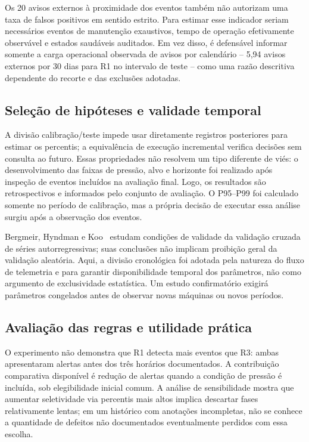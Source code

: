 \documentclass[conference]{IEEEtran}
\begin{document}
Os 20 avisos externos à proximidade dos eventos também não autorizam uma taxa de falsos positivos em sentido estrito. Para estimar esse indicador seriam necessários eventos de manutenção exaustivos, tempo de operação efetivamente observável e estados saudáveis auditados. Em vez disso, é defensável informar somente a carga operacional observada de avisos por calendário -- 5,94 avisos externos por 30 dias para R1 no intervalo de teste -- como uma razão descritiva dependente do recorte e das exclusões adotadas.

\subsection{Seleção de hipóteses e validade temporal}

A divisão calibração/teste impede usar diretamente registros posteriores para estimar os percentis; a equivalência de execução incremental verifica decisões sem consulta ao futuro. Essas propriedades não resolvem um tipo diferente de viés: o desenvolvimento das faixas de pressão, alvo e horizonte foi realizado após inspeção de eventos incluídos na avaliação final. Logo, os resultados são retrospectivos e informados pelo conjunto de avaliação. O P95--P99 foi calculado somente no período de calibração, mas a própria decisão de executar essa análise surgiu após a observação dos eventos.

Bergmeir, Hyndman e Koo~\cite{bergmeir2018note} estudam condições de validade da validação cruzada de séries autorregressivas; suas conclusões não implicam proibição geral da validação aleatória. Aqui, a divisão cronológica foi adotada pela natureza do fluxo de telemetria e para garantir disponibilidade temporal dos parâmetros, não como argumento de exclusividade estatística. Um estudo confirmatório exigirá parâmetros congelados antes de observar novas máquinas ou novos períodos.

\subsection{Avaliação das regras e utilidade prática}

O experimento não demonstra que R1 detecta mais eventos que R3: ambas apresentaram alertas antes dos três horários documentados. A contribuição comparativa disponível é redução de alertas quando a condição de pressão é incluída, sob elegibilidade inicial comum. A análise de sensibilidade mostra que aumentar seletividade via percentis mais altos implica descartar fases relativamente lentas; em um histórico com anotações incompletas, não se conhece a quantidade de defeitos não documentados eventualmente perdidos com essa escolha.
\end{document}
